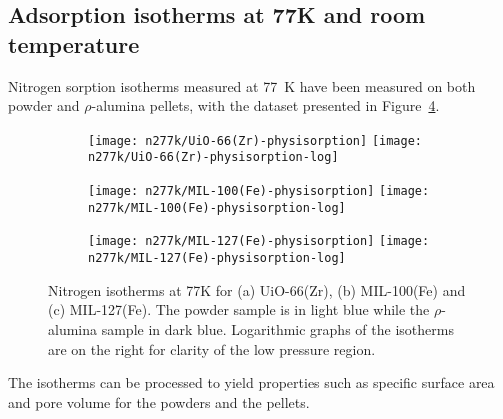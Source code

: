 
\subsection{Adsorption isotherms at 77K and room temperature}

Nitrogen sorption isotherms measured at \SI{77}{\kelvin} have been
measured on both powder and \(\rho\)-alumina pellets, with the dataset
presented in Figure~\ref{fgr:shaping:n2adsorption}.

\begin{figure}[p!]
    \centering
    
    \begin{subfigure}{\linewidth}
        \centering
        \parbox{0.1\linewidth}{\caption{}\label{fgr:shaping:n277kuio66}}%
        \texttt{[image: n277k/UiO-66(Zr)-physisorption]}%
        \texttt{[image: n277k/UiO-66(Zr)-physisorption-log]}%
    \end{subfigure}

    \begin{subfigure}{\linewidth}
        \centering
        \parbox[c]{0.1\linewidth}{\caption{}\label{fgr:shaping:n277kuio66}}%
        \texttt{[image: n277k/MIL-100(Fe)-physisorption]}%
        \texttt{[image: n277k/MIL-100(Fe)-physisorption-log]}%
    \end{subfigure}

    \begin{subfigure}{\linewidth}
        \centering
        \parbox[c]{0.1\linewidth}{\caption{}\label{fgr:shaping:n277kmil127}}%
        \texttt{[image: n277k/MIL-127(Fe)-physisorption]}%
        \texttt{[image: n277k/MIL-127(Fe)-physisorption-log]}%
        \label{fgr:shaping:n277kmil127}
    \end{subfigure}
    
    \caption{Nitrogen isotherms at 77K for (a) UiO-66(Zr), 
    (b) MIL-100(Fe) and (c) MIL-127(Fe). The powder sample is in light
    blue while the \(\rho\)-alumina sample in dark blue. Logarithmic
    graphs of the isotherms are on the right for clarity of the low
    pressure region.}%
    \label{fgr:shaping:n2adsorption}
\end{figure}

The isotherms can be processed to yield properties such as specific 
surface area and pore volume for the powders and 
the pellets.

